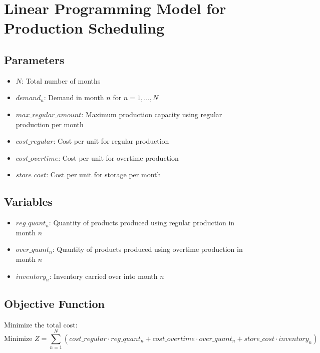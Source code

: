 \documentclass{article}
\begin{document}
\section*{Linear Programming Model for Production Scheduling}

\subsection*{Parameters}
\begin{itemize}
    \item $N$: Total number of months
    \item $demand_n$: Demand in month $n$ for $n = 1, \ldots, N$
    \item $max\_regular\_amount$: Maximum production capacity using regular production per month
    \item $cost\_regular$: Cost per unit for regular production
    \item $cost\_overtime$: Cost per unit for overtime production
    \item $store\_cost$: Cost per unit for storage per month
\end{itemize}

\subsection*{Variables}
\begin{itemize}
    \item $reg\_quant_n$: Quantity of products produced using regular production in month $n$
    \item $over\_quant_n$: Quantity of products produced using overtime production in month $n$
    \item $inventory_n$: Inventory carried over into month $n$
\end{itemize}

\subsection*{Objective Function}
Minimize the total cost:
\[
\text{Minimize } Z = \sum_{n=1}^{N} \left( cost\_regular \cdot reg\_quant_n + cost\_overtime \cdot over\_quant_n + store\_cost \cdot inventory_n \right)
\]
\end{document}
